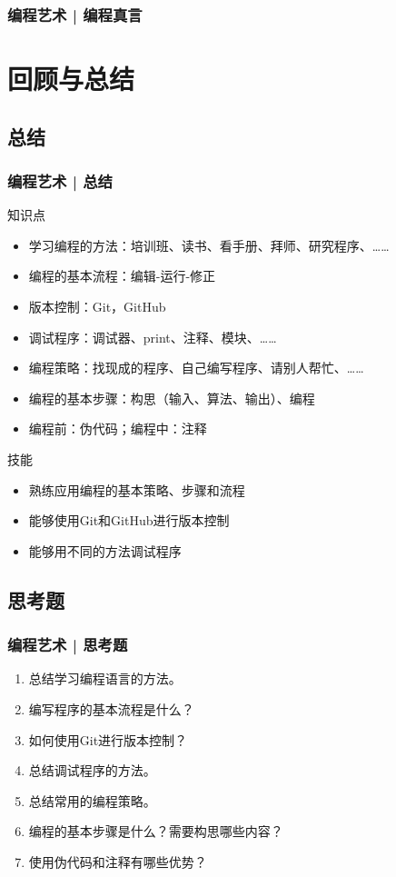 \begin{frame}
  \frametitle{编程艺术 | 编程真言}
\end{frame}

\section{回顾与总结}
\subsection{总结}
\begin{frame}
  \frametitle{编程艺术 | 总结}
  \begin{block}{知识点}
    \begin{itemize}
      \item 学习编程的方法：培训班、读书、看手册、拜师、研究程序、……
      \item 编程的基本流程：编辑-运行-修正
      \item 版本控制：Git，GitHub
      \item 调试程序：调试器、print、注释、模块、……
      \item 编程策略：找现成的程序、自己编写程序、请别人帮忙、……
      \item 编程的基本步骤：构思（输入、算法、输出）、编程
      \item 编程前：伪代码；编程中：注释
    \end{itemize}
  \end{block}
  \pause
  \begin{block}{技能}
    \begin{itemize}
      \item 熟练应用编程的基本策略、步骤和流程
      \item 能够使用Git和GitHub进行版本控制
      \item 能够用不同的方法调试程序
    \end{itemize}
  \end{block}
\end{frame}

\subsection{思考题}
\begin{frame}
  \frametitle{编程艺术 | 思考题}
  \begin{enumerate}
    \item 总结学习编程语言的方法。
    \item 编写程序的基本流程是什么？
    \item 如何使用Git进行版本控制？
    \item 总结调试程序的方法。
    \item 总结常用的编程策略。
    \item 编程的基本步骤是什么？需要构思哪些内容？
    \item 使用伪代码和注释有哪些优势？
  \end{enumerate}
\end{frame}


